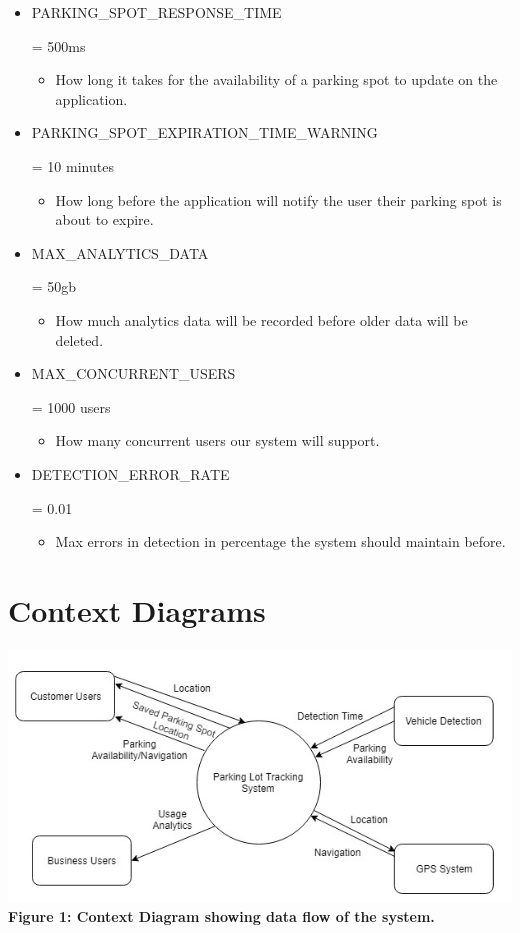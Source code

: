 \documentclass[]{article}
\begin{document}
\begin{itemize}
	\item \hypertarget{RESPONSETIME}{PARKING\_SPOT\_RESPONSE\_TIME}= 500ms 
	\begin{itemize}
		\item How long it takes for the availability of a parking spot to update on the application.
	\end{itemize}

	\item \hypertarget{EXPTIME}{PARKING\_SPOT\_EXPIRATION\_TIME\_WARNING}= 10 minutes
	\begin{itemize}
		\item How long before the application will notify the user their parking spot is about to expire.
	\end{itemize}

	\item \hypertarget{ANALYTICSDATA}{MAX\_ANALYTICS\_DATA}= 50gb
	\begin{itemize}
		\item How much analytics data will be recorded before older data will be deleted.
	\end{itemize}

	\item \hypertarget{CONCUSERS}{MAX\_CONCURRENT\_USERS}= 1000 users
	\begin{itemize}
		\item How many concurrent users our system will support.
	\end{itemize}

	\item \hypertarget{DETERR}{DETECTION\_ERROR\_RATE}= 0.01%
	\begin{itemize}
		\item Max errors in detection in percentage the system should maintain before.
	\end{itemize}
\end{itemize}
\section{Context Diagrams}

\graphicspath{ {./images/} }
	\begin{center}
		\includegraphics{context-diagram}
		\textbf{Figure 1: Context Diagram showing data flow of the system.}
	\end{center}
\end{document}
